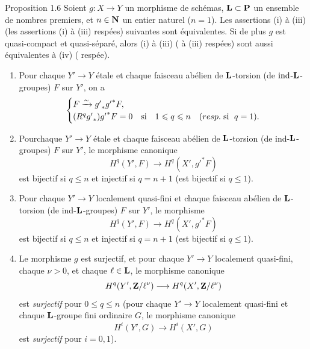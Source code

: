 \documentclass[10pt]{../fichiers-configuration-latex/smfart}
\begin{document}
\begin{enonce*}{Proposition 1.6}
Soient $g:X\rightarrow Y$ un morphisme de schémas, $\mathbf{L}\subset
\mathbf{P}$ un ensemble de nombres premiers, et $n \in \mathbf{N}$ un
entier naturel (\resp $n=1$). Les assertions {\rm (i)} à {\rm(iii)}
(\resp les assertions {\rm(i)} à {\rm(iii)} respées) suivantes sont
équivalentes. Si de plus $g$ est quasi-compact et quasi-séparé, alors
{\rm(i)} à {\rm(iii)} ( à {\rm(iii)} respées) sont aussi
équivalentes à {\rm(iv)} ( respée).
\begin{enumerate}
\renewcommand{\theenumi}{\roman{enumi}}
\renewcommand{\labelenumi}{(\theenumi)}
\item Pour chaque $Y'\rightarrow Y$ étale et chaque faisceau abélien
  de $\mathbf{L}$-torsion (\resp de $\text{\rm ind}$-$\mathbf{L}$-groupes)
  \emph{} $F$ sur $Y'$, on a
$$
\begin{cases}
F\xrightarrow{\sim} {g'}_{\ast}{g'}^{\ast}F, &\\
(R^{q}{g'}_{\ast}){g'}^{\ast}F=0 & \mbox{si}\quad 1\leqslant q\leqslant n\quad
(resp.\kern.3em \mbox{si\; } q=1){}.
\end{cases}
$$

\item Pour\pageoriginale chaque $Y'\rightarrow Y$ étale et chaque
faisceau abélien de $\mathbf{L}$-torsion (\resp de
ind-$\mathbf{L}$-groupes) $F$ sur $Y'$, le morphisme
canonique
$$
H^{q}(Y',F)\longrightarrow H^{q}(X',{g'}^{\ast}F)
$$
est bijectif si $q\leq n$ et injectif si $q=n+1$ (\resp est bijectif
si $q\leq 1$).

\item Pour chaque $Y'\rightarrow Y$ localement quasi-fini et chaque
faisceau abélien de $\mathbf{L}$-torsion (\resp de
ind-$\mathbf{L}$-groupes) $F$ sur $Y'$, le morphisme
$$
H^{q}(Y',F)\longrightarrow H^{q}(X', {g'}^{\ast}F)
$$
est bijectif si $q\leq n$ et injectif si $q=n+1$ (\resp est bijectif
si $q\leq 1$).

\item Le morphisme $g$ est surjectif, et pour chaque $Y'\rightarrow Y$
localement quasi-fini, chaque $\nu>0$, et chaque $\ell\in \mathbf{L}$,
le morphisme canonique
$$
H^{q}(Y',\mathbf{Z}/\ell^{\nu})\longrightarrow H^{q}(X', \mathbf{Z}/\ell^{\nu})
$$
est \emph{surjectif} pour $0\leq q\leq n$ (\resp pour chaque
$Y'\rightarrow Y$ localement quasi-fini et chaque $\mathbf{L}$-groupe
fini ordinaire $G$, le morphisme canonique
$$
H^{i}(Y',G)\longrightarrow H^{i}(X', G)
$$
est \emph{surjectif} pour $i=0,1$). 
\end{enumerate}
\end{enonce*}
\end{document}
